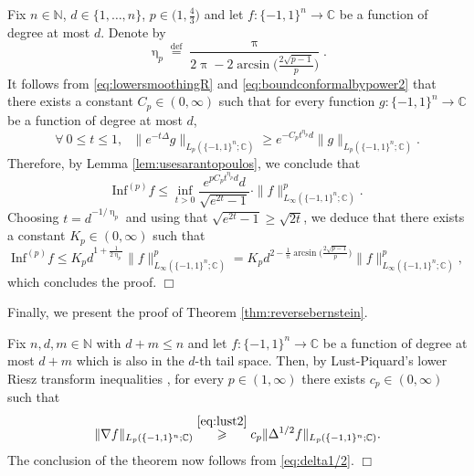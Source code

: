\documentclass[11pt,reqno]{amsart}
\renewcommand{\leq}{\leqslant}
\renewcommand{\geq}{\geqslant}
\renewcommand{\pi}{\uppi}
\newcommand{\1}{\mathbf 1}
\theoremstyle{remark}
\newcommand{\C}{\mathbb C}
\newcommand{\N}{\mathbb N}
\newcommand{\eqdef}{\stackrel{\mathrm{def}}{=}}
\renewcommand{\pi}{\uppi}
\renewcommand{\eta}{\upeta}
\renewcommand{\pi}{\uppi}
\begin{document}
Fix $n\in\N$, $d\in\{1,\ldots,n\}$, $p\in\big(1,\frac{4}{3}\big)$ and let $f:\{-1,1\}^n\to \C$ be a function of degree at most $d$. Denote by
\begin{equation}
\eta_p \eqdef \frac{\pi}{2\pi - 2\arcsin\Big( \frac{2\sqrt{p-1}}{p}\Big)}.
\end{equation}
It follows from \eqref{eq:lowersmoothingR} and \eqref{eq:boundconformalbypower2} that there exists a constant $C_p\in(0,\infty)$ such that for every function $g:\{-1,1\}^n\to\C$ be a function of degree at most $d$,
\begin{equation}
\forall \ 0\leq t\leq1, \ \ \ \|e^{-t\Delta}g\|_{L_p(\{-1,1\}^n;\C)} \geq e^{-C_p t^{\eta_p}d}\|g\|_{L_p(\{-1,1\}^n;\C)}.
\end{equation}
Therefore, by Lemma \ref{lem:usesarantopoulos}, we conclude that
\begin{equation}
\mathrm{Inf}^{(p)} f \leq  \inf_{t>0} \frac{e^{pC_p t^{\eta_p}d}d}{\sqrt{e^{2t}-1}} \cdot \|f\|_{L_\infty(\{-1,1\}^n;\C)}^p.
\end{equation}
Choosing $t = d^{-1/\eta_p}$ and using that $\sqrt{e^{2t}-1}\geq \sqrt{2t}$, we deduce that there exists a constant $K_p\in(0,\infty)$ such that
\begin{equation} \label{eq:finalinfluencebound}
\mathrm{Inf}^{(p)} f \leq K_p d^{1+\frac{1}{2\eta_p}} \|f\|_{L_\infty(\{-1,1\}^n;\C)}^p = K_pd^{2-\frac{1}{\pi}\arcsin\big(\frac{2\sqrt{p-1}}{p}\big)} \|f\|_{L_\infty(\{-1,1\}^n;\C)}^p,
\end{equation}
which concludes the proof.
\hfill$\Box$

\medskip

Finally, we present the proof of Theorem \ref{thm:reversebernstein}.
\medskip

 Fix $n,d,m\in\N$ with $d+m\leq n$ and let $f:\{-1,1\}^n\to \C$ be a function of degree at most $d+m$ which is also in the $d$-th tail space. Then, by Lust-Piquard's lower Riesz transform inequalities \cite{LP98}, for every $p\in(1,\infty)$ there exists $c_p\in(0,\infty)$ such that
\begin{equation}
\|\nabla f\|_{L_p(\{-1,1\}^n;\C)} \stackrel{\eqref{eq:lust2}}{\geq} c_p \|\Delta^{1/2}f\|_{L_p(\{-1,1\}^n;\C)}.
\end{equation}
The conclusion of the theorem now follows from \eqref{eq:delta1/2}.
\hfill$\Box$



\nocite{*}
\end{document}
